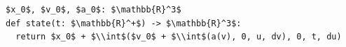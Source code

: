 \documentclass[border=10pt]{standalone}
\begin{document}
\begin{lstlisting}
$x_0$, $v_0$, $a_0$: $\mathbb{R}^3$
def state(t: $\mathbb{R}^+$) -> $\mathbb{R}^3$:
  return $x_0$ + $\\int$($v_0$ + $\\int$(a(v), 0, u, dv), 0, t, du)
\end{lstlisting}
\end{document}
